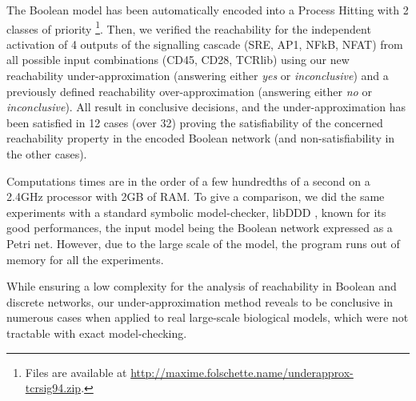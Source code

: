 The Boolean model has been automatically encoded into a Process Hitting with 2 classes of priority%
\footnote{Files are available at
\url{http://maxime.folschette.name/underapprox-tcrsig94.zip}.}.
Then, we verified the reachability for the independent activation of 4 outputs of the signalling
cascade (SRE, AP1, NFkB, NFAT) from all possible input combinations (CD45, CD28, TCRlib) using our
new reachability under-approximation (answering either \emph{yes} or \emph{inconclusive}) and a 
previously defined reachability over-approximation \cite{PMR12-MSCS} (answering either \emph{no} or
\emph{inconclusive}).
All result in conclusive decisions, and the under-approximation has been satisfied in 12 cases (over
32) proving the satisfiability of the concerned reachability property in the encoded Boolean network
(and non-satisfiability in the other cases).

Computations times are in the order of a few hundredths of a second on a 2.4GHz processor with 2GB
of RAM.
To give a comparison, we did the same experiments with a standard symbolic model-checker, libDDD
\cite{libddd}, known for its good performances, the input model being the Boolean network expressed
as a Petri net.
However, due to the large scale of the model, the program runs out of memory for all the experiments.

While ensuring a low complexity for the analysis of reachability in Boolean and discrete networks, our
under-approximation method reveals to be conclusive in numerous cases when applied to real
large-scale biological models, which were not tractable with exact model-checking.

